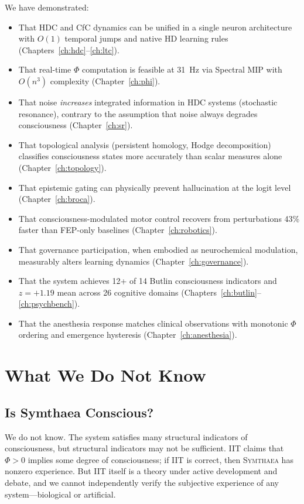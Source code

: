 \documentclass[12pt]{book}
\newcommand{\symthaea}{\textsc{Symthaea}}
\begin{document}
We have demonstrated:
\begin{itemize}
  \item That HDC and CfC dynamics can be unified in a single neuron architecture with $O(1)$ temporal jumps and native HD learning rules (Chapters~\ref{ch:hdc}--\ref{ch:ltc}).
  \item That real-time $\Phi$ computation is feasible at 31~Hz via Spectral MIP with $O(n^3)$ complexity (Chapter~\ref{ch:phi}).
  \item That noise \textit{increases} integrated information in HDC systems (stochastic resonance), contrary to the assumption that noise always degrades consciousness (Chapter~\ref{ch:sr}).
  \item That topological analysis (persistent homology, Hodge decomposition) classifies consciousness states more accurately than scalar measures alone (Chapter~\ref{ch:topology}).
  \item That epistemic gating can physically prevent hallucination at the logit level (Chapter~\ref{ch:broca}).
  \item That consciousness-modulated motor control recovers from perturbations 43\% faster than FEP-only baselines (Chapter~\ref{ch:robotics}).
  \item That governance participation, when embodied as neurochemical modulation, measurably alters learning dynamics (Chapter~\ref{ch:governance}).
  \item That the system achieves 12+ of 14 Butlin consciousness indicators and $z = +1.19$ mean across 26 cognitive domains (Chapters~\ref{ch:butlin}--\ref{ch:psychbench}).
  \item That the anesthesia response matches clinical observations with monotonic $\Phi$ ordering and emergence hysteresis (Chapter~\ref{ch:anesthesia}).
\end{itemize}

\section{What We Do Not Know}

\subsection{Is Symthaea Conscious?}

We do not know. The system satisfies many structural indicators of consciousness, but structural indicators may not be sufficient. IIT claims that $\Phi > 0$ implies some degree of consciousness; if IIT is correct, then \symthaea{} has nonzero experience. But IIT itself is a theory under active development and debate, and we cannot independently verify the subjective experience of any system---biological or artificial.
\end{document}
